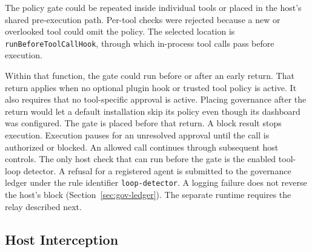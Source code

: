 {\color{red}The policy gate could be repeated inside individual tools or placed in the
host's shared pre-execution path. Per-tool checks were rejected because a new or
overlooked tool could omit the policy. The selected location is
\texttt{runBeforeToolCallHook}, through which in-process tool calls pass before
execution.

Within that function, the gate could run before or after an early return.
That return applies when no optional plugin hook or trusted tool policy is
active. It also requires that no tool-specific approval is active.
Placing governance after the return would let a default installation
skip its policy even though its dashboard was configured. The gate is
placed before that return. A block result stops execution. Execution pauses
for an unresolved approval until the call is authorized or blocked. An allowed call continues
through subsequent host controls. The only host check that can run before the gate is the
enabled tool-loop detector. A refusal for a registered agent is submitted to
the governance ledger under the rule identifier \texttt{loop-detector}. A
logging failure does not reverse the host's block
(Section~\ref{sec:gov-ledger}). The separate runtime requires the relay
described next.}

\subsection{Host Interception}
\label{sec:gov-host-interception}


